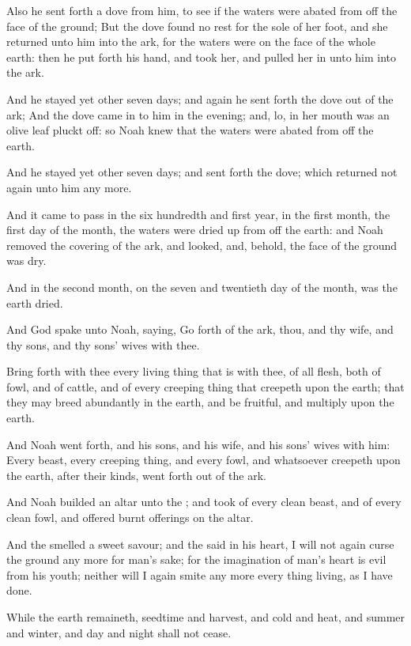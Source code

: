 \Verse Also he sent forth a dove from him, to see if the waters were abated from off the face of the ground; \Verse But the dove found no rest for the sole of her foot, and she returned unto him into the ark, for the waters were on the face of the whole earth: then he put forth his hand, and took her, and pulled her in unto him into the ark.

\Verse And he stayed yet other seven days; and again he sent forth the dove out of the ark; \Verse And the dove came in to him in the evening; and, lo, in her mouth was an olive leaf pluckt off: so Noah knew that the waters were abated from off the earth.

\Verse And he stayed yet other seven days; and sent forth the dove; which returned not again unto him any more.

\Verse And it came to pass in the six hundredth and first year, in the first month, the first day of the month, the waters were dried up from off the earth: and Noah removed the covering of the ark, and looked, and, behold, the face of the ground was dry.

\Verse And in the second month, on the seven and twentieth day of the month, was the earth dried.

\Verse And God spake unto Noah, saying, \Verse Go forth of the ark, thou, and thy wife, and thy sons, and thy sons' wives with thee.

\Verse Bring forth with thee every living thing that is with thee, of all flesh, both of fowl, and of cattle, and of every creeping thing that creepeth upon the earth; that they may breed abundantly in the earth, and be fruitful, and multiply upon the earth.

\Verse And Noah went forth, and his sons, and his wife, and his sons' wives with him: \Verse Every beast, every creeping thing, and every fowl, and whatsoever creepeth upon the earth, after their kinds, went forth out of the ark.

\Verse And Noah builded an altar unto the \LORD; and took of every clean beast, and of every clean fowl, and offered burnt offerings on the altar.

\Verse And the \LORD smelled a sweet savour; and the \LORD said in his heart, I will not again curse the ground any more for man's sake; for the imagination of man's heart is evil from his youth; neither will I again smite any more every thing living, as I have done.

\Verse While the earth remaineth, seedtime and harvest, and cold and heat, and summer and winter, and day and night shall not cease.

